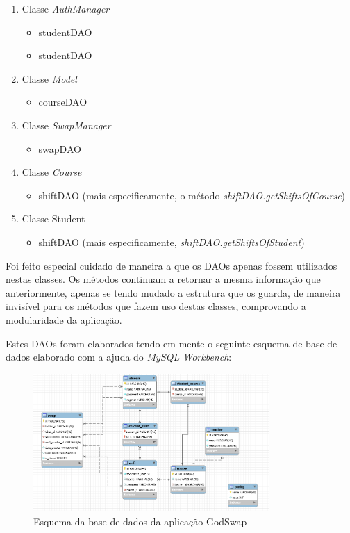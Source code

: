 \documentclass[a4paper]{article}
\begin{document}
\begin{enumerate}
   \item Classe \emph{AuthManager}
   \begin{itemize}
     \item studentDAO
     \item studentDAO
   \end{itemize}
   \item Classe \emph{Model}
   \begin{itemize}
       \item courseDAO
   \end{itemize}
   \item Classe \emph{SwapManager}
   \begin{itemize}
       \item swapDAO
   \end{itemize}
   \item Classe \emph{Course}
   \begin{itemize}
       \item shiftDAO (mais especificamente, o método \emph{shiftDAO.getShiftsOfCourse})
   \end{itemize}
   \item Classe {Student}
   \begin{itemize}
       \item shiftDAO (mais especificamente, \emph{shiftDAO.getShiftsOfStudent})
   \end{itemize}
\end{enumerate}

\clearpage
Foi feito especial cuidado de maneira a que os DAOs apenas fossem utilizados nestas classes. Os métodos continuam a retornar a mesma informação que anteriormente, apenas se tendo mudado a estrutura que os guarda, de maneira invisível para os métodos que fazem uso destas classes, comprovando a modularidade da aplicação.

Estes DAOs foram elaborados tendo em mente o seguinte esquema de base de dados elaborado com a ajuda do \emph{MySQL Workbench}:

\begin{figure}[h]
\caption{Esquema da base de dados da aplicação GodSwap}
\centering
\includegraphics[width=0.8\textwidth]{database}
\end{figure}
\end{document}
